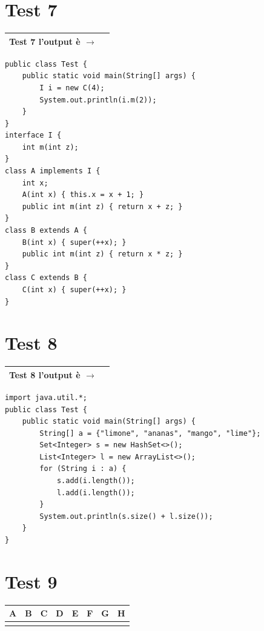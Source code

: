 \documentclass[a4paper,12pt]{article}
\newcommand{\outputbox}[1]{%
  \vspace{0.4em}
  \noindent
  \begin{tabular}{|l|p{10cm}|}
    \hline
    \rule{0pt}{1.8em}\textbf{#1} \quad l'output è $\rightarrow$ & \phantom{XXXXXXXXXXXXXXXXXXX} \\
    \hline
  \end{tabular}
  \vspace{0.4em}
}
\begin{document}
\section*{Test 7}
\outputbox{Test 7}

\begin{lstlisting}[style=java]
public class Test {
    public static void main(String[] args) {
        I i = new C(4);
        System.out.println(i.m(2));
    }
}
interface I {
    int m(int z);
}
class A implements I {
    int x;
    A(int x) { this.x = x + 1; }
    public int m(int z) { return x + z; }
}
class B extends A {
    B(int x) { super(++x); }
    public int m(int z) { return x * z; }
}
class C extends B {
    C(int x) { super(++x); }
}
\end{lstlisting}

\section*{Test 8}
\outputbox{Test 8}

\begin{lstlisting}[style=java]
import java.util.*;
public class Test {
    public static void main(String[] args) {
        String[] a = {"limone", "ananas", "mango", "lime"};
        Set<Integer> s = new HashSet<>();
        List<Integer> l = new ArrayList<>();
        for (String i : a) {
            s.add(i.length());
            l.add(i.length());
        }
        System.out.println(s.size() + l.size());
    }
}
\end{lstlisting}

\section*{Test 9}

\noindent
\begin{tabular}{|c|c|c|c|c|c|c|c|}
\hline
\rule{0pt}{1.4em}\textbf{A} & \textbf{B} & \textbf{C} & \textbf{D} & \textbf{E} & \textbf{F} & \textbf{G} & \textbf{H} \\[2pt]
\hline
\phantom{XXX} & \phantom{XXX} & \phantom{XXX} & \phantom{XXX} & \phantom{XXX} & \phantom{XXX} & \phantom{XXX} & \phantom{XXX} \\[8pt]
\hline
\end{tabular}
\end{document}
